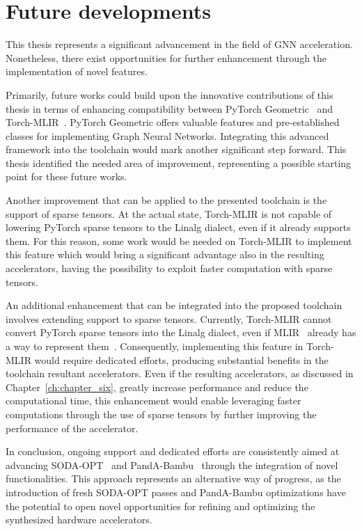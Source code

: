 \section{Future developments}
\label{sec:future-dev}%


This thesis represents a significant advancement in the field of GNN acceleration.
Nonetheless, there exist opportunities for further enhancement through the implementation of novel features.

Primarily, future works could build upon the innovative contributions of this thesis in terms of enhancing compatibility between PyTorch Geometric~\cite{DBLP:journals/corr/abs-1903-02428} and Torch-MLIR~\cite{torch_mlir}.
PyTorch Geometric offers valuable features and pre-established classes for implementing Graph Neural Networks.
Integrating this advanced framework into the toolchain would mark another significant step forward.
This thesis identified the needed area of improvement, representing a possible starting point for these future works.

Another improvement that can be applied to the presented toolchain is the support of sparse tensors.
At the actual state, Torch-MLIR is not capable of lowering PyTorch sparse tensors to the Linalg dialect, even if it already supports them.
For this reason, some work would be needed on Torch-MLIR to implement this feature which would bring a significant advantage also in the resulting accelerators, having the possibility to exploit faster computation with sparse tensors.

An additional enhancement that can be integrated into the proposed toolchain involves extending support to sparse tensors.
Currently, Torch-MLIR cannot convert PyTorch sparse tensors into the Linalg dialect, even if MLIR~\cite{9370308} already has a way to represent them~\cite{Bik_2022}.
Consequently, implementing this feature in Torch-MLIR would require dedicated efforts, producing substantial benefits in the toolchain resultant accelerators.
Even if the resulting accelerators, as discussed in Chapter~\ref{ch:chapter_six}, greatly increase performance and reduce the computational time, this enhancement would enable leveraging faster computations through the use of sparse tensors by further improving the performance of the accelerator.

In conclusion, ongoing support and dedicated efforts are consistently aimed at advancing SODA-OPT~\cite{9786533} and PandA-Bambu~\cite{9586110} through the integration of novel functionalities.
This approach represents an alternative way of progress, as the introduction of fresh SODA-OPT passes and PandA-Bambu optimizations have the potential to open novel opportunities for refining and optimizing the synthesized hardware accelerators.